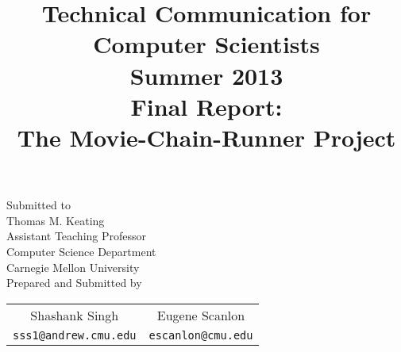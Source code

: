 \documentclass[11pt,english]{article}
\title{
{\normalsize \bf Technical Communication for Computer Scientists\\
Summer 2013}\\
\vspace{4cm}
{\bf Final Report:\\The Movie-Chain-Runner Project}}
\author{
}
\begin{document}
\begin{titlepage}
\maketitle
\vfill
\begin{center}
Submitted to\\
Thomas M. Keating\\
Assistant Teaching Professor\\
Computer Science Department\\
Carnegie Mellon University\\
\vspace{1cm}
Prepared and Submitted by\\
\vspace{0.5cm}

\begin{tabular}{cc}
Shashank Singh \hspace{2cm} & Eugene Scanlon \\
\texttt{sss1@andrew.cmu.edu} \hspace{2cm} & \texttt{escanlon@cmu.edu}
\end{tabular}
\end{center}
\end{titlepage}
\end{document}
